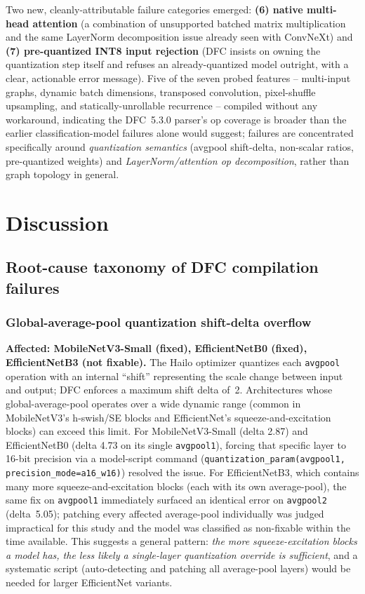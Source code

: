\documentclass[11pt]{article}
\begin{document}
Two new, cleanly-attributable failure categories emerged: \textbf{(6) native
multi-head attention} (a combination of unsupported batched matrix
multiplication and the same LayerNorm decomposition issue already seen with
ConvNeXt) and \textbf{(7) pre-quantized INT8 input rejection} (DFC insists on
owning the quantization step itself and refuses an already-quantized model
outright, with a clear, actionable error message). Five of the seven probed
features -- multi-input graphs, dynamic batch dimensions, transposed
convolution, pixel-shuffle upsampling, and statically-unrollable recurrence
-- compiled without any workaround, indicating the DFC~5.3.0 parser's op
coverage is broader than the earlier classification-model failures alone
would suggest; failures are concentrated specifically around
\emph{quantization semantics} (avgpool shift-delta, non-scalar ratios,
pre-quantized weights) and \emph{LayerNorm/attention op decomposition},
rather than graph topology in general.

\section{Discussion}

\subsection{Root-cause taxonomy of DFC compilation failures}

\subsubsection{Global-average-pool quantization shift-delta overflow}
\textbf{Affected: MobileNetV3-Small (fixed), EfficientNetB0 (fixed),
EfficientNetB3 (not fixable).} The Hailo optimizer quantizes each
\texttt{avgpool} operation with an internal ``shift'' representing the scale
change between input and output; DFC enforces a maximum shift delta of~2.
Architectures whose global-average-pool operates over a wide dynamic range
(common in MobileNetV3's h-swish/SE blocks and EfficientNet's
squeeze-and-excitation blocks) can exceed this limit. For MobileNetV3-Small
(delta 2.87) and EfficientNetB0 (delta 4.73 on its single \texttt{avgpool1}),
forcing that specific layer to 16-bit precision via a model-script command
(\texttt{quantization\_param(avgpool1, precision\_mode=a16\_w16)}) resolved the
issue. For EfficientNetB3, which contains many more squeeze-and-excitation
blocks (each with its own average-pool), the same fix on \texttt{avgpool1}
immediately surfaced an identical error on \texttt{avgpool2} (delta~5.05);
patching every affected average-pool individually was judged impractical for
this study and the model was classified as non-fixable within the time
available. This suggests a general pattern: \emph{the more squeeze-excitation
blocks a model has, the less likely a single-layer quantization override is
sufficient}, and a systematic script (auto-detecting and patching all
average-pool layers) would be needed for larger EfficientNet variants.
\end{document}
